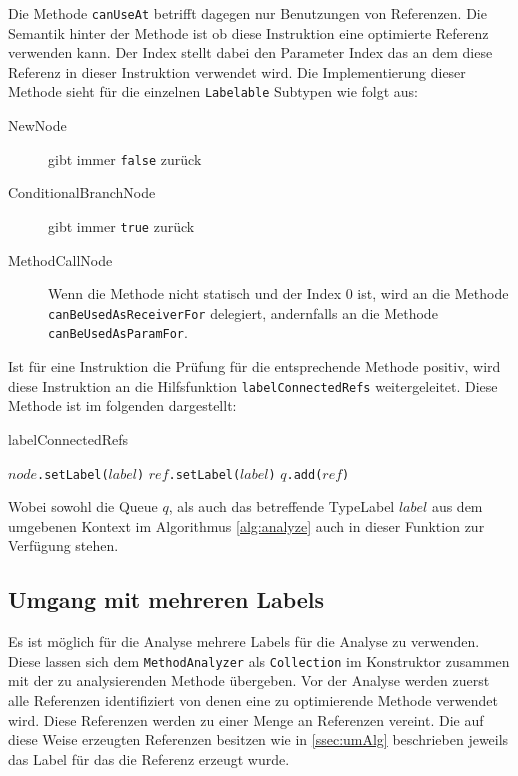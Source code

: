 Die Methode \texttt{canUseAt} betrifft dagegen nur Benutzungen von Referenzen. Die Semantik
hinter der Methode ist ob diese Instruktion eine optimierte Referenz verwenden kann. Der Index 
stellt dabei den Parameter Index das an dem diese Referenz in dieser Instruktion verwendet wird. 
Die Implementierung dieser Methode sieht für die einzelnen \texttt{Labelable}
Subtypen wie folgt aus:

\begin{description}
	\item[NewNode] gibt immer \texttt{false} zurück
	\item[ConditionalBranchNode] gibt immer \texttt{true} zurück
	\item[MethodCallNode] Wenn die Methode nicht statisch und der Index 0 ist, wird an die Methode
	\texttt{canBeUsedAsReceiverFor} delegiert, andernfalls an die Methode \texttt{canBeUsedAsParamFor}.
\end{description}

Ist für eine Instruktion die Prüfung für die entsprechende Methode positiv, wird diese 
Instruktion an die Hilfsfunktion \texttt{labelConnectedRefs} weitergeleitet. Diese Methode 
ist im folgenden dargestellt:

\begin{algorithm}[H]
	\caption{labelConnectedRefs}\label{alg:labelConnRefs}
	\begin{algorithmic}[1]
		\STATE \texttt{$node$.setLabel($label$)}
				\STATE \texttt{$ref$.setLabel($label$)}
				\STATE \texttt{$q$.add($ref$)}
			\ENDIF 
		\ENDFOR
	\end{algorithmic}
\end{algorithm}

Wobei sowohl die Queue $q$, als auch das betreffende TypeLabel $label$ aus dem umgebenen Kontext
im Algorithmus \ref{alg:analyze} auch in dieser Funktion zur Verfügung stehen. 

\subsection{Umgang mit mehreren Labels}

Es ist möglich für die Analyse mehrere Labels für die Analyse zu verwenden. Diese lassen
sich dem \texttt{MethodAnalyzer} als \texttt{Collection} im Konstruktor zusammen 
mit der zu analysierenden Methode übergeben. Vor der Analyse werden zuerst alle Referenzen 
identifiziert von denen eine zu optimierende Methode verwendet wird. Diese Referenzen werden 
zu einer Menge an Referenzen vereint. Die auf diese Weise erzeugten Referenzen besitzen 
wie in \ref{ssec:umAlg} beschrieben jeweils das Label für das die Referenz erzeugt wurde.

